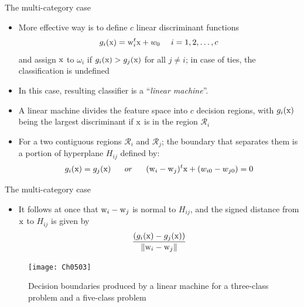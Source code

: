 \begin{frame}{The multi-category case}
\begin{itemize}
\item More effective way is to define $c$ linear discriminant functions
\begin{equation}
g_i({\rm x})={\rm w}^t_i{\rm x}+w_0~~~~i=1,2,\ldots,c \nonumber
\end{equation}
	and assign ${\rm x}$ to $\omega_i$ if $g_i({\rm x}) > g_j({\rm x})$ for all $j\neq i$; in case of ties, the classification is undefined
\item In this case, resulting classifier is a ``\textit{\color{slidecolor}linear machine}''.
\item A linear machine divides the feature space into $c$ decision regions, with $g_i({\rm x})$ being the largest discriminant if ${\rm x}$ is in the region $\mathcal{R}_i$
\item For a two contiguous regions $\mathcal{R}_i$ and $\mathcal{R}_j$; the boundary that separates them is a portion of hyperplane $H_{ij}$ defined by:
\begin{equation}
g_i({\rm x})=g_j({\rm x})~~~~~or~~~~~({\rm w}_i-{\rm w}_j)^t{\rm x}+(w_{i0}-w_{j0})=0 \nonumber
\end{equation}
\end{itemize}
\end{frame}

\begin{frame}{The multi-category case}
\begin{itemize}
\item It follows at once that ${\rm w}_i-{\rm w}_j$ is normal to $H_{ij}$, and the signed distance from ${\rm x}$ to $H_{ij}$ is given by 
\begin{equation}
\frac{{({g_i}({\rm x}) - {g_j}({\rm x}))}}{{\left\| {{{\rm w}_i} - {{\rm w}_j}} \right\|}} \nonumber
\end{equation}
\end{itemize}
\begin{figure}
\texttt{[image: Ch0503]}
\caption{Decision boundaries produced by a linear machine for a three-class problem and a five-class problem}
\end{figure}
\end{frame}




